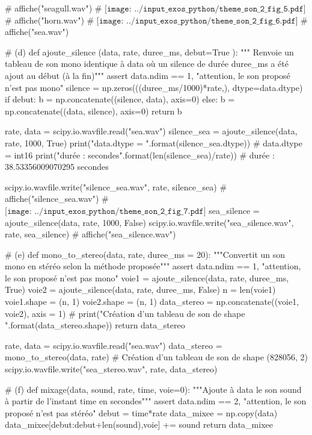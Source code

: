 \documentclass[10pt,fleqn]{article} %
\begin{document}
\begin{corrige}
\begin{python}
# affiche("seagull.wav")
# $\texttt{[image: ../input\_exos\_python/theme\_son\_2\_fig\_5.pdf]}$
# affiche("horn.wav")    
# $\texttt{[image: ../input\_exos\_python/theme\_son\_2\_fig\_6.pdf]}$
# affiche("sea.wav")    
    
# (d)
def ajoute_silence (data, rate, duree_ms, debut=True ):
    """ Renvoie un tableau de son mono identique à data
    où un silence de durée duree_ms a été ajout au début (à la fin)"""
    assert data.ndim == 1, "attention, le son proposé n'est pas mono"
    silence = np.zeros(((duree_ms/1000)*rate,), dtype=data.dtype)
    if debut:
        b = np.concatenate((silence, data), axis=0)
    else:
        b = np.concatenate((data, silence), axis=0)
    return b

rate, data = scipy.io.wavfile.read("sea.wav")
silence_sea = ajoute_silence(data, rate, 1000, True)
print("data.dtype = {}".format(silence_sea.dtype))
# data.dtype = int16
print("durée : {} secondes".format(len(silence_sea)/rate))
# durée : 38.53356009070295 secondes

scipy.io.wavfile.write("silence_sea.wav", rate, silence_sea)
# affiche("silence_sea.wav")
# $\texttt{[image: ../input\_exos\_python/theme\_son\_2\_fig\_7.pdf]}$
sea_silence = ajoute_silence(data, rate, 1000, False)
scipy.io.wavfile.write("sea_silence.wav", rate, sea_silence)
# affiche("sea_silence.wav")

# (e)
def mono_to_stereo(data, rate, duree_ms = 20):
    """Convertit un son mono en stéréo
    selon la méthode proposée"""
    assert data.ndim == 1, "attention, le son proposé n'est pas mono"
    voie1 = ajoute_silence(data, rate, duree_ms, True)
    voie2 = ajoute_silence(data, rate, duree_ms, False)
    n = len(voie1)
    voie1.shape = (n, 1)
    voie2.shape = (n, 1)
    data_stereo = np.concatenate((voie1, voie2), axis = 1)
    # print("Création d'un tableau de son de shape {}".format(data_stereo.shape))
    return data_stereo

rate, data = scipy.io.wavfile.read("sea.wav")
data_stereo = mono_to_stereo(data, rate)
# Création d'un tableau de son de shape (828056, 2)
scipy.io.wavfile.write("sea_stereo.wav", rate, data_stereo)

# (f)
def mixage(data, sound, rate, time, voie=0):
    """Ajoute à data le son sound à partir de l'instant time en secondes"""
    assert data.ndim == 2, "attention, le son proposé n'est pas stéréo"
    debut = time*rate
    data_mixee = np.copy(data)
    data_mixee[debut:debut+len(sound),voie] += sound
    return data_mixee


\end{python}
\end{corrige}
\end{document}
